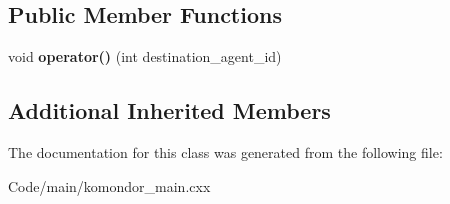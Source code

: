 \subsection*{Public Member Functions}
\begin{DoxyCompactItemize}
\item 
\mbox{\label{classcompcxx__CentralController__26_1_1my__CentralController__outportRequestInformationToAgent__f__t_a9272eebb4bbeca90e4b46d69ae9b9fa3}} 
void {\bfseries operator()} (int destination\+\_\+agent\+\_\+id)
\end{DoxyCompactItemize}
\subsection*{Additional Inherited Members}


The documentation for this class was generated from the following file\+:\begin{DoxyCompactItemize}
\item 
Code/main/komondor\+\_\+main.\+cxx\end{DoxyCompactItemize}
